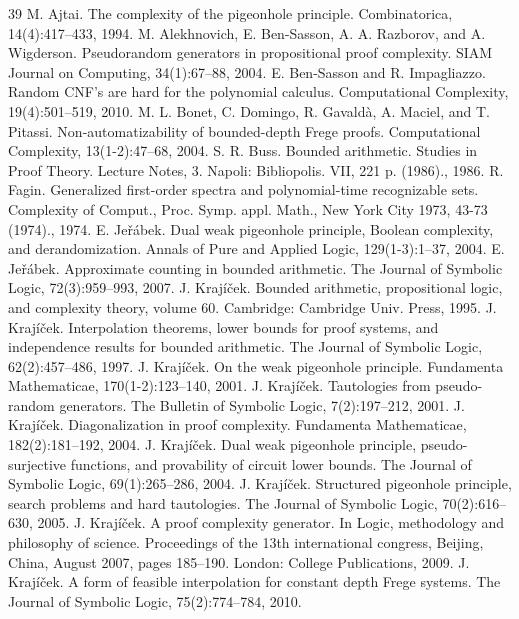 \begin{thebibliography}{39}
 M. Ajtai. The complexity of the pigeonhole principle. Combinatorica, 14(4):417–433, 1994.
 M. Alekhnovich, E. Ben-Sasson, A. A. Razborov, and A. Wigderson. Pseudorandom generators in propositional proof complexity. SIAM Journal on Computing, 34(1):67–88, 2004.
 E. Ben-Sasson and R. Impagliazzo. Random CNF’s are hard for the polynomial calculus. Computational Complexity, 19(4):501–519, 2010.
 M. L. Bonet, C. Domingo, R. Gavaldà, A. Maciel, and T. Pitassi. Non-automatizability of bounded-depth Frege proofs. Computational Complexity, 13(1-2):47–68, 2004.
 S. R. Buss. Bounded arithmetic. Studies in Proof Theory. Lecture Notes, 3. Napoli: Bibliopolis. VII, 221 p. (1986)., 1986.
 R. Fagin. Generalized first-order spectra and polynomial-time recognizable sets. Complexity of Comput., Proc. Symp. appl. Math., New York City 1973, 43-73 (1974)., 1974.
 E. Jeřábek. Dual weak pigeonhole principle, Boolean complexity, and derandomization. Annals of Pure and Applied Logic, 129(1-3):1–37, 2004.
 E. Jeřábek. Approximate counting in bounded arithmetic. The Journal of Symbolic Logic, 72(3):959–993, 2007.
 J. Krajíček. Bounded arithmetic, propositional logic, and complexity theory, volume 60. Cambridge: Cambridge Univ. Press, 1995.
 J. Krajíček. Interpolation theorems, lower bounds for proof systems, and independence results for bounded arithmetic. The Journal of Symbolic Logic, 62(2):457–486, 1997.
 J. Krajíček. On the weak pigeonhole principle. Fundamenta Mathematicae, 170(1-2):123–140, 2001.
 J. Krajíček. Tautologies from pseudo-random generators. The Bulletin of Symbolic Logic, 7(2):197–212, 2001.
 J. Krajíček. Diagonalization in proof complexity. Fundamenta Mathematicae, 182(2):181–192, 2004.
 J. Krajíček. Dual weak pigeonhole principle, pseudo-surjective functions, and provability of circuit lower bounds. The Journal of Symbolic Logic, 69(1):265–286, 2004.
 J. Krajíček. Structured pigeonhole principle, search problems and hard tautologies. The Journal of Symbolic Logic, 70(2):616–630, 2005.
 J. Krajíček. A proof complexity generator. In Logic, methodology and philosophy of science. Proceedings of the 13th international congress, Beijing, China, August 2007, pages 185–190. London: College Publications, 2009.
 J. Krajíček. A form of feasible interpolation for constant depth Frege systems. The Journal of Symbolic Logic, 75(2):774–784, 2010.

\end{thebibliography}
